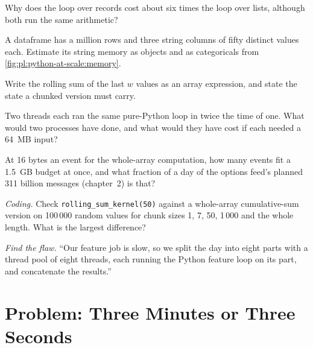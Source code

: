 \begin{exercise}[$\star$]\label{exo:pl:python-at-scale:2}
Why does the loop over records cost about six times the loop over lists, although both run the same arithmetic?
\end{exercise}

\begin{exercise}[$\star$]\label{exo:pl:python-at-scale:3}
A dataframe has a million rows and three string columns of fifty distinct values each. Estimate its string memory as objects and as
categoricals from \cref{fig:pl:python-at-scale:memory}.
\end{exercise}

\begin{exercise}[$\star\star$]\label{exo:pl:python-at-scale:4}
Write the rolling sum of the last $w$ values as an array expression, and state the state a chunked version must carry.
\end{exercise}

\begin{exercise}[$\star\star$]\label{exo:pl:python-at-scale:5}
Two threads each ran the same pure-Python loop in twice the time of one. What would two processes have done, and what would they
have cost if each needed a 64~MB input?
\end{exercise}

\begin{exercise}[$\star\star$]\label{exo:pl:python-at-scale:6}
At 16 bytes an event for the whole-array computation, how many events fit a 1.5~GB budget at once, and what fraction of a day of the
options feed's planned 311 billion messages (chapter~2) is that?
\end{exercise}

\begin{exercise}[$\star\star\star$]\label{exo:pl:python-at-scale:7}
\emph{Coding.} Check \texttt{rolling\_sum\_kernel(50)} against a whole-array cumulative-sum version on 100\,000 random values for
chunk sizes 1, 7, 50, 1\,000 and the whole length. What is the largest difference?
\end{exercise}

\begin{exercise}[$\star\star\star$]\label{exo:pl:python-at-scale:8}
\emph{Find the flaw.} ``Our feature job is slow, so we split the day into eight parts with a thread pool of eight threads, each running
the Python feature loop on its part, and concatenate the results.''
\end{exercise}

\section{Problem: Three Minutes or Three Seconds}

